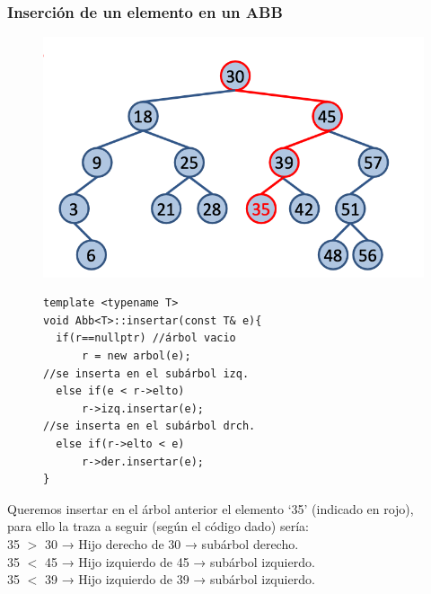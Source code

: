 \subsubsection*{Inserción de un elemento en un ABB}
\begin{figure}[h]
  \begin{minipage}{0.4\textwidth}
    \vspace*{-2cm}
    \includegraphics[width=\textwidth]{assets/abb5.png}
  \end{minipage}
  \hfill
  \begin{minipage}{0.5\textwidth}
    \begin{verbatim}
template <typename T>
void Abb<T>::insertar(const T& e){
  if(r==nullptr) //árbol vacio
      r = new arbol(e);
//se inserta en el subárbol izq.
  else if(e < r->elto) 
      r->izq.insertar(e);
//se inserta en el subárbol drch.
  else if(r->elto < e)
      r->der.insertar(e);
}
    \end{verbatim}
  \end{minipage}
\end{figure}

 Queremos insertar en el árbol anterior el elemento `35' (indicado en rojo),\\para ello la traza a seguir (según el código dado) sería:
\\
\hspace*{1cm}35 $>$ 30 → Hijo derecho de 30 → subárbol derecho.\\
\hspace*{1cm}35 $<$ 45 → Hijo izquierdo de 45 → subárbol izquierdo.\\
\hspace*{1cm}35 $<$ 39 → Hijo izquierdo de 39 → subárbol izquierdo.\\

